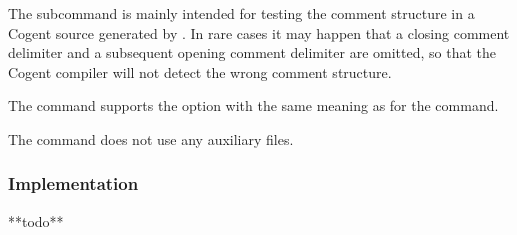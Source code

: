 The subcommand  is mainly intended for testing the comment structure in a Cogent source generated by
. In rare cases it may happen that a closing comment delimiter and a subsequent opening comment delimiter
are omitted, so that the Cogent compiler will not detect the wrong comment structure.

The  command supports the option  with the same meaning as
for the  command.

The  command does not use any auxiliary files.

\subsubsection{Implementation}

**todo**

